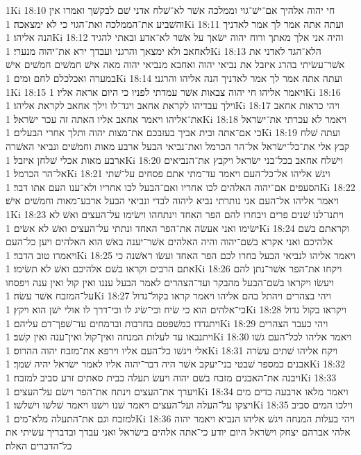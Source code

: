 1Ki 18:10  חי יהוה אלהיך אם־ישׁ־גוי וממלכה אשׁר לא־שׁלח אדני שׁם לבקשׁך ואמרו אין והשׁביע את־הממלכה ואת־הגוי כי לא ימצאכה׃
1Ki 18:11  ועתה אתה אמר לך אמר לאדניך הנה אליהו׃
1Ki 18:12  והיה אני אלך מאתך ורוח יהוה ישׂאך על אשׁר לא־אדע ובאתי להגיד לאחאב ולא ימצאך והרגני ועבדך ירא את־יהוה מנערי׃
1Ki 18:13  הלא־הגד לאדני את אשׁר־עשׂיתי בהרג איזבל את נביאי יהוה ואחבא מנביאי יהוה מאה אישׁ חמשׁים חמשׁים אישׁ במערה ואכלכלם לחם ומים׃
1Ki 18:14  ועתה אתה אמר לך אמר לאדניך הנה אליהו והרגני׃
1Ki 18:15  ויאמר אליהו חי יהוה צבאות אשׁר עמדתי לפניו כי היום אראה אליו׃
1Ki 18:16  וילך עבדיהו לקראת אחאב ויגד־לו וילך אחאב לקראת אליהו׃
1Ki 18:17  ויהי כראות אחאב את־אליהו ויאמר אחאב אליו האתה זה עכר ישׂראל׃
1Ki 18:18  ויאמר לא עכרתי את־ישׂראל כי אם־אתה ובית אביך בעזבכם את־מצות יהוה ותלך אחרי הבעלים׃
1Ki 18:19  ועתה שׁלח קבץ אלי את־כל־ישׂראל אל־הר הכרמל ואת־נביאי הבעל ארבע מאות וחמשׁים ונביאי האשׁרה ארבע מאות אכלי שׁלחן איזבל׃
1Ki 18:20  וישׁלח אחאב בכל־בני ישׂראל ויקבץ את־הנביאים אל־הר הכרמל׃
1Ki 18:21  ויגשׁ אליהו אל־כל־העם ויאמר עד־מתי אתם פסחים על־שׁתי הסעפים אם־יהוה האלהים לכו אחריו ואם־הבעל לכו אחריו ולא־ענו העם אתו דבר׃
1Ki 18:22  ויאמר אליהו אל־העם אני נותרתי נביא ליהוה לבדי ונביאי הבעל ארבע־מאות וחמשׁים אישׁ׃
1Ki 18:23  ויתנו־לנו שׁנים פרים ויבחרו להם הפר האחד וינתחהו וישׂימו על־העצים ואשׁ לא ישׂימו ואני אעשׂה את־הפר האחד ונתתי על־העצים ואשׁ לא אשׂים׃
1Ki 18:24  וקראתם בשׁם אלהיכם ואני אקרא בשׁם־יהוה והיה האלהים אשׁר־יענה באשׁ הוא האלהים ויען כל־העם ויאמרו טוב הדבר׃
1Ki 18:25  ויאמר אליהו לנביאי הבעל בחרו לכם הפר האחד ועשׂו ראשׁנה כי אתם הרבים וקראו בשׁם אלהיכם ואשׁ לא תשׂימו׃
1Ki 18:26  ויקחו את־הפר אשׁר־נתן להם ויעשׂו ויקראו בשׁם־הבעל מהבקר ועד־הצהרים לאמר הבעל עננו ואין קול ואין ענה ויפסחו על־המזבח אשׁר עשׂה׃
1Ki 18:27  ויהי בצהרים ויהתל בהם אליהו ויאמר קראו בקול־גדול כי־אלהים הוא כי שׂיח וכי־שׂיג לו וכי־דרך לו אולי ישׁן הוא ויקץ׃
1Ki 18:28  ויקראו בקול גדול ויתגדדו כמשׁפטם בחרבות וברמחים עד־שׁפך־דם עליהם׃
1Ki 18:29  ויהי כעבר הצהרים ויתנבאו עד לעלות המנחה ואין־קול ואין־ענה ואין קשׁב׃
1Ki 18:30  ויאמר אליהו לכל־העם גשׁו אלי ויגשׁו כל־העם אליו וירפא את־מזבח יהוה ההרוס׃
1Ki 18:31  ויקח אליהו שׁתים עשׂרה אבנים כמספר שׁבטי בני־יעקב אשׁר היה דבר־יהוה אליו לאמר ישׂראל יהיה שׁמך׃
1Ki 18:32  ויבנה את־האבנים מזבח בשׁם יהוה ויעשׂ תעלה כבית סאתים זרע סביב למזבח׃
1Ki 18:33  ויערך את־העצים וינתח את־הפר וישׂם על־העצים׃
1Ki 18:34  ויאמר מלאו ארבעה כדים מים ויצקו על־העלה ועל־העצים ויאמר שׁנו וישׁנו ויאמר שׁלשׁו וישׁלשׁו׃
1Ki 18:35  וילכו המים סביב למזבח וגם את־התעלה מלא־מים׃
1Ki 18:36  ויהי בעלות המנחה ויגשׁ אליהו הנביא ויאמר יהוה אלהי אברהם יצחק וישׂראל היום יודע כי־אתה אלהים בישׂראל ואני עבדך ובדבריך עשׂיתי את כל־הדברים האלה׃
